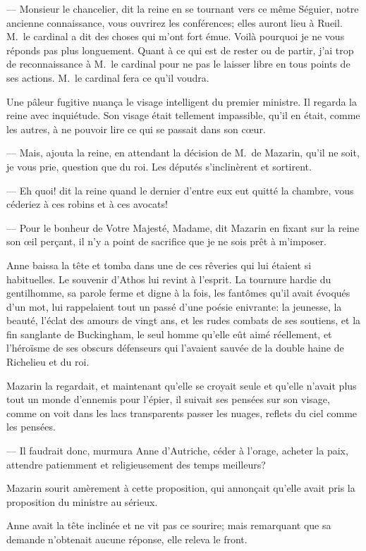 — Monsieur le chancelier, dit la reine en se tournant vers ce même Séguier, notre ancienne connaissance, vous ouvrirez les conférences; elles auront lieu à Rueil. M.~le cardinal a dit des choses qui m'ont fort émue. Voilà pourquoi je ne vous réponds pas plus longuement. Quant à ce qui est de rester ou de partir, j'ai trop de reconnaissance à M.~le cardinal pour ne pas le laisser libre en tous points de ses actions. M.~le cardinal fera ce qu'il voudra.

Une pâleur fugitive nuança le visage intelligent du premier ministre. Il regarda la reine avec inquiétude. Son visage était tellement impassible, qu'il en était, comme les autres, à ne pouvoir lire ce qui se passait dans son cœur.

— Mais, ajouta la reine, en attendant la décision de M.~de Mazarin, qu'il ne soit, je vous prie, question que du roi.
Les députés s'inclinèrent et sortirent.

— Eh quoi! dit la reine quand le dernier d'entre eux eut quitté la chambre, vous céderiez à ces robins et à ces avocats!

— Pour le bonheur de Votre Majesté, Madame, dit Mazarin en fixant sur la reine son œil perçant, il n'y a point de sacrifice que je ne sois prêt à m'imposer.

Anne baissa la tête et tomba dans une de ces rêveries qui lui étaient si habituelles. Le souvenir d'Athos lui revint à l'esprit. La tournure hardie du gentilhomme, sa parole ferme et digne à la fois, les fantômes qu'il avait évoqués d'un mot, lui rappelaient tout un passé d'une poésie enivrante: la jeunesse, la beauté, l'éclat des amours de vingt ans, et les rudes combats de ses soutiens, et la fin sanglante de Buckingham, le seul homme qu'elle eût aimé réellement, et l'héroïsme de ses obscurs défenseurs qui l'avaient sauvée de la double haine de Richelieu et du roi.

Mazarin la regardait, et maintenant qu'elle se croyait seule et qu'elle n'avait plus tout un monde d'ennemis pour l'épier, il suivait ses pensées sur son visage, comme on voit dans les lacs transparents passer les nuages, reflets du ciel comme les pensées.

— Il faudrait donc, murmura Anne d'Autriche, céder à l'orage, acheter la paix, attendre patiemment et religieusement des temps meilleurs?

Mazarin sourit amèrement à cette proposition, qui annonçait qu'elle avait pris la proposition du ministre au sérieux.

Anne avait la tête inclinée et ne vit pas ce sourire; mais remarquant que sa demande n'obtenait aucune réponse, elle releva le front.

